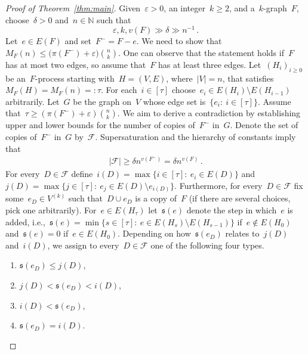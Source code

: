 \documentclass[10pt,a4paper]{amsart}
\newcommand{\cF}{\mathcal{F}}
\begin{document}
    \begin{proof}[Proof of Theorem~\ref{thm:main}]
        Given~$\varepsilon>0$, an integer~$k\geq2$, and a~$k$-graph~$F$, choose~$\delta>0$ and~$n\in\mathds{N}$ such that $$\varepsilon,k,v(F)\gg\delta\gg n^{-1}\,.$$
        Let~$e\in E(F)$ and set~$F^-=F-e$.
        We need to show that~$M_F(n)
         \leq
         \big(\pi(F^-)+\varepsilon\big)\binom{n}{k}$.
        One can observe that the statement holds if~$F$ has at most two edges, so assume that~$F$ has at least three edges.
        Let~$(H_i)_{i\geq0}$ be an~$F$-process starting with~$H=(V,E)$, where~$\vert V\vert=n$, that satisfies~$M_F(H)= M_F(n)=:\tau$.
        For each~$i\in[\tau]$ choose~$e_i\in E(H_i)\setminus E(H_{i-1})$ arbitrarily.
        Let~$G$ be the graph on~$V$ whose edge set is~$\{e_i:\:i\in[\tau]\}$.
        Assume that~$\tau\geq(\pi(F^-)+\varepsilon)\binom{n}{k}$.
        We aim to derive a contradiction by establishing upper and lower bounds for the number of copies of~$F^-$ in~$G$.
        Denote the set of copies of~$F^-$ in~$G$ by~$\cF$.
        Supersaturation and the hierarchy of constants imply that
        \begin{align}\label{eq:Flower}
            \vert\cF\vert\geq\delta n^{v(F^-)}=\delta n^{v(F)}\,.
        \end{align}
        For every~$D\in\cF$ define~$i(D)=\max\{i\in[\tau]:\:e_i\in E(D)\}$ and~$j(D)=\max\{j\in[\tau]:\:e_j\in E(D)\setminus e_{i(D)}\}$.
        Furthermore, for every~$D\in\cF$ fix some~$e_D\in V^{(k)}$ such that~$D \cup e_D$ is a copy of~$F$ (if there are several choices, pick one arbitrarily).
        For~$e\in E(H_{\tau})$ let~$\mathfrak{s}(e)$ denote the step in which~$e$ is added, i.e.,~$\mathfrak{s}(e)=\min\{s\in[\tau]:\:e\in E(H_s)\setminus E(H_{s-1})\}$ if~$e\notin E(H_0)$ and~$\mathfrak{s}(e)=0$ if~$e\in E(H_0)$.
        Depending on how~$\mathfrak{s}(e_D)$ relates to~$j(D)$ and~$i(D)$, we assign to every~$D \in \cF$ one of the following four types.
        \begin{enumerate}[leftmargin=1.95cm]
            \item[Type~$1$:]\label{it:type1}
            $\mathfrak{s}(e_D)\leq j(D)$,
            \item[Type~$2$:]\label{it:type2}
            $j(D)< \mathfrak{s}(e_D)< i(D)$,
            \item[Type~$3$:]\label{it:type3}
            $i(D) < \mathfrak{s}(e_D)$,
            \item[Type~$4$:]\label{it:type4}
            $\mathfrak{s}(e_D)=i(D)$.
        \end{enumerate}


\end{proof}
\end{document}
